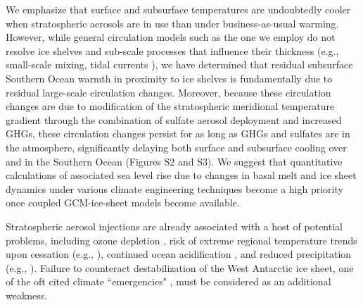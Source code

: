 \documentclass{nature}
\begin{document}
We emphasize that surface and subsurface temperatures are undoubtedly cooler when stratospheric aerosols are in use than under business-as-usual warming. However, while general circulation models such as the one we employ do not resolve ice shelves and sub-scale processes that influence their thickness (e.g., small-scale mixing, tidal currents \cite{joughin11}), we have determined that residual subsurface Southern Ocean warmth in proximity to ice shelves is fundamentally due to residual large-scale circulation changes. Moreover, because these circulation changes are due to modification of the stratospheric meridional temperature gradient through the combination of sulfate aerosol deployment and increased GHGs, these circulation changes persist for as long as GHGs and sulfates are in the atmosphere, significantly delaying both surface and subsurface cooling over and in the Southern Ocean (Figures S2 and S3). We suggest that quantitative calculations of associated sea level rise due to changes in basal melt and ice sheet dynamics under various climate engineering techniques become a high priority once coupled GCM-ice-sheet models become available.

Stratospheric aerosol injections are already associated with a host of potential problems, including ozone depletion \cite{tilmes08,heckendorn09}, risk of extreme regional temperature trends upon cessation (e.g., \cite{mccusker14}), continued ocean acidification \cite{feely04}, and reduced precipitation (e.g., \cite{bala08}). Failure to counteract destabilization of the West Antarctic ice sheet, one of the oft cited climate ``emergencies" \cite{blackstock09}, must be considered as an additional weakness.

\end{document}

